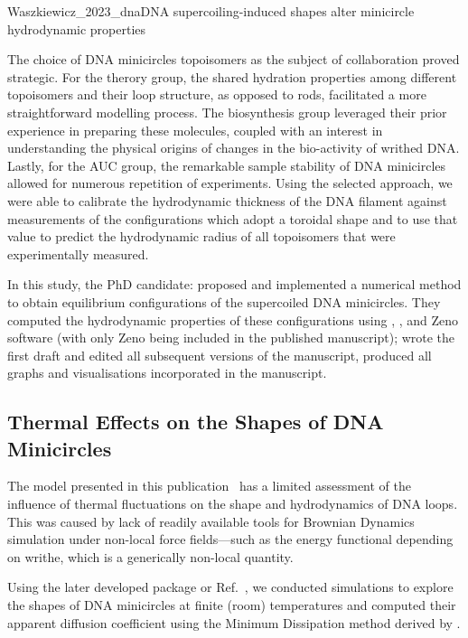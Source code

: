 \documentclass{doctoral}
\newcommand{\code}[1]{\texttt{\detokenize{#1}}}
\begin{document}
\begin{publicationpage}{Waszkiewicz_2023_dna}{DNA supercoiling-induced shapes alter minicircle hydrodynamic properties}
{        The choice of DNA minicircles topoisomers as the subject of collaboration proved strategic.
        For the therory group, the shared hydration properties among different topoisomers and their loop structure, as opposed to rods, facilitated a more straightforward modelling process.
        The biosynthesis group leveraged their prior experience in preparing these molecules, coupled with an interest in understanding the physical origins of changes in the bio-activity of writhed DNA.
        Lastly, for the AUC group, the remarkable sample stability of DNA minicircles allowed for numerous repetition of experiments.
        Using the selected approach, we were able to calibrate the hydrodynamic thickness of the DNA filament against measurements of the configurations which adopt a toroidal shape and to use that value to predict the hydrodynamic radius of all topoisomers that were experimentally measured.

        In this study, the PhD candidate: proposed and implemented a numerical method to obtain equilibrium configurations of the supercoiled DNA minicircles.
        They computed the hydrodynamic properties of these configurations using \code{GRPY}, \code{pygrpy}, and Zeno software (with only Zeno being included in the published manuscript); wrote the first draft and edited all subsequent versions of the manuscript, produced all graphs and visualisations incorporated in the manuscript.
    }
\end{publicationpage}


\subsection{Thermal Effects on the Shapes of DNA Minicircles}

The model presented in this publication~\cite{Waszkiewicz_2023_dna} has a limited assessment of the influence of thermal fluctuations on the shape and hydrodynamics of DNA loops.
This was caused by lack of readily available tools for Brownian Dynamics simulation under non-local force fields---such as the energy functional depending on writhe, which is a generically non-local quantity.

Using the later developed \code{pychastic} package or Ref.~\cite{Waszkiewicz_2023_pychastic}, we conducted simulations to explore the shapes of DNA minicircles at finite (room) temperatures and computed their apparent diffusion coefficient using the Minimum Dissipation method derived by \textcite{Cichocki_2019}.
\end{document}
